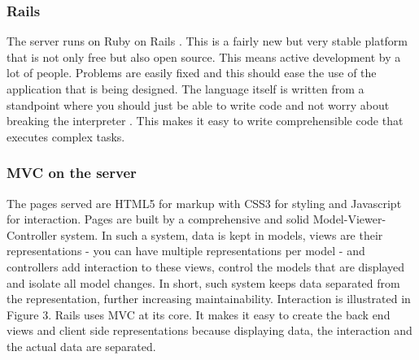 \documentclass{report}
\begin{document}
				\subsubsection{Rails}
					The server runs on Ruby on Rails \cite{ror} . This is a fairly new but very stable platform that is not only free but also open source. This means active development by a lot of people. Problems are easily fixed and this should ease the use of the application that is being designed. The language itself is written from a standpoint where you should just be able to write code and not worry about breaking the interpreter \cite{ruby} . This makes it easy to write comprehensible code that executes complex tasks.
								
				\subsubsection{MVC on the server}
					The pages served are HTML5 for markup with CSS3 for styling and Javascript for interaction. Pages are built by a comprehensive and solid Model-Viewer-Controller system. In such a system, data is kept in models, views are their representations - you can have multiple representations per model - and controllers add interaction to these views, control the models that are displayed and isolate all model changes. In short, such system keeps data separated from the representation, further increasing maintainability. Interaction is illustrated in Figure 3. Rails uses MVC at its core. It makes it easy to create the back end views and client side representations because displaying data, the interaction and the actual data are separated.
					
\end{document}
